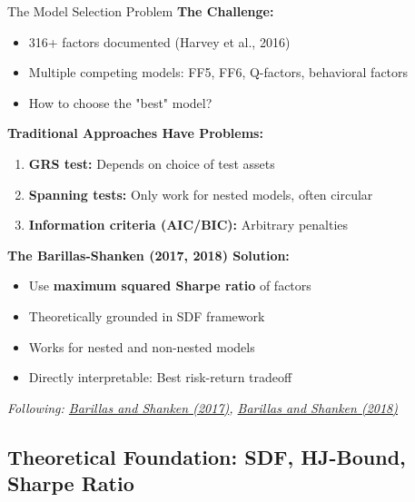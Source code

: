 \documentclass{beamer}
\begin{document}
\begin{frame}{The Model Selection Problem}
    \textbf{The Challenge:}
    \begin{itemize}
        \item 316+ factors documented (Harvey et al., 2016)
        \item Multiple competing models: FF5, FF6, Q-factors, behavioral factors
        \item How to choose the "best" model?
    \end{itemize}
    
    \vspace{0.3cm}
    \textbf{Traditional Approaches Have Problems:}
    \begin{enumerate}
        \item \textbf{GRS test:} Depends on choice of test assets
        \item \textbf{Spanning tests:} Only work for nested models, often circular
        \item \textbf{Information criteria (AIC/BIC):} Arbitrary penalties
    \end{enumerate}
    
    \vspace{0.3cm}
    \textbf{The Barillas-Shanken (2017, 2018) Solution:}
    \begin{itemize}
        \item Use \textbf{maximum squared Sharpe ratio} of factors
        \item Theoretically grounded in SDF framework
        \item Works for nested and non-nested models
        \item Directly interpretable: Best risk-return tradeoff
    \end{itemize}
    
    
    \textit{Following: \textcolor{blue}{\href{https://doi.org/10.1093/rfs/hhw101}{Barillas and Shanken (2017)}}, \textcolor{blue}{\href{https://doi.org/10.1111/jofi.12607}{Barillas and Shanken (2018)}}}
\end{frame}

\subsection{Theoretical Foundation: SDF, HJ-Bound, Sharpe Ratio}
\end{document}

